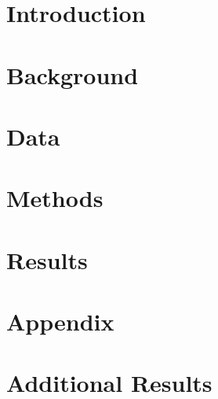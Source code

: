 \documentclass[11pt, english, letterpaper]{article}
\begin{document}
\newpage 

\newpage



\vspace{-5mm} \section{Introduction}
\label{sec:intro}


\section{Background}
\label{sec:background}


\section{Data}
\label{sec:data}


\section{Methods}
\label{sec:methods}


\section{Results}
\label{sec:results}


% 

\newpage

\printbibliography

\setcounter{page}{1}
\setcounter{table}{0}
\setcounter{figure}{0}
\setcounter{section}{0}
\renewcommand{\thetable}{\thesection\arabic{table}}
\renewcommand{\thefigure}{\thesection\arabic{figure}}
\renewcommand{\thepage}{\thesection\arabic{page}}
\renewcommand\thesection{\Alph{section}}
\renewcommand\thesubsection{\thesection.\arabic{subsection}}
\newpage
\section*{Appendix}
\section{Additional Results}



% 
\end{document}
